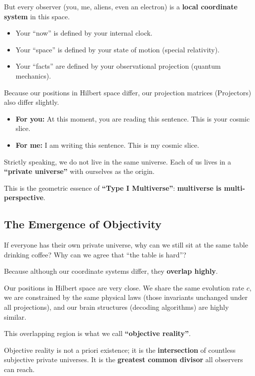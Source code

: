 \documentclass[11pt,a4paper,twoside]{book}
\begin{document}
But every observer (you, me, aliens, even an electron) is a \textbf{local coordinate system} in this space.

\begin{itemize}
\item Your ``now'' is defined by your internal clock.

\item Your ``space'' is defined by your state of motion (special relativity).

\item Your ``facts'' are defined by your observational projection (quantum mechanics).
\end{itemize}

Because our positions in Hilbert space differ, our projection matrices (Projectors) also differ slightly.

\begin{itemize}
\item \textbf{For you:} At this moment, you are reading this sentence. This is your cosmic slice.

\item \textbf{For me:} I am writing this sentence. This is my cosmic slice.
\end{itemize}

Strictly speaking, we do not live in the same universe. Each of us lives in a \textbf{``private universe''} with ourselves as the origin.

This is the geometric essence of \textbf{``Type I Multiverse''}: \textbf{multiverse is multi-perspective}.

\subsection{The Emergence of Objectivity}

If everyone has their own private universe, why can we still sit at the same table drinking coffee? Why can we agree that ``the table is hard''?

Because although our coordinate systems differ, they \textbf{overlap highly}.

Our positions in Hilbert space are very close. We share the same evolution rate $c$, we are constrained by the same physical laws (those invariants unchanged under all projections), and our brain structures (decoding algorithms) are highly similar.

This overlapping region is what we call \textbf{``objective reality''}.

Objective reality is not a priori existence; it is the \textbf{intersection} of countless subjective private universes. It is the \textbf{greatest common divisor} all observers can reach.
\end{document}
